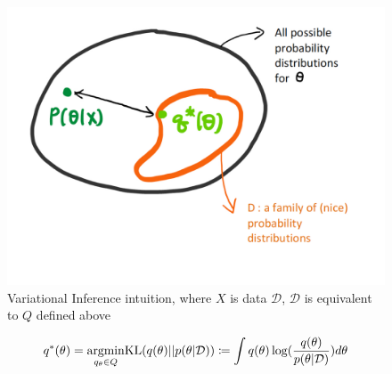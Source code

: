\begin{figure}[H]
	\center
	\includegraphics[scale = 0.2]{VIoptimization}
	\caption{Variational Inference intuition, where $X$ is data $\mathcal{D}$, $\mathcal{D}$ is equivalent to $Q$ defined above}
	\label{fig:VIoptimization}
\end{figure}

\begin{equation}
	\label{eq:VI1}
	q^{*}(\theta) = \underset{q_{\theta} \in Q}{\operatorname{argmin}} \textnormal{KL}(q(\theta)||p(\theta|\mathcal{D})) \coloneqq \int q(\theta)\log(\frac{q(\theta)}{p(\theta|\mathcal{D})})d\theta
\end{equation}

